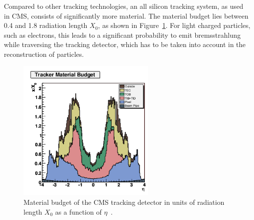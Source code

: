 Compared to other tracking technologies, an all silicon tracking system, as used in CMS, consists of significantly more material. The material budget lies between 0.4 and 1.8 radiation length $X_0$, as shown in Figure~\ref{fig:trackerMaterial}. For light charged particles, such as electrons, this leads to a significant probability to emit bremsstrahlung while traversing the tracking detector, which has to be taken into account in the reconstruction of particles.    
\begin{figure}[htbp]
\centering
  \includegraphics[width=0.6\textwidth]{plots/CMS/TrackerMaterial.png}
\caption{Material budget of the CMS tracking detector in units of radiation length $X_0$ as a function of $\eta$~\cite{CMS}.}
\label{fig:trackerMaterial}
\end{figure} 
